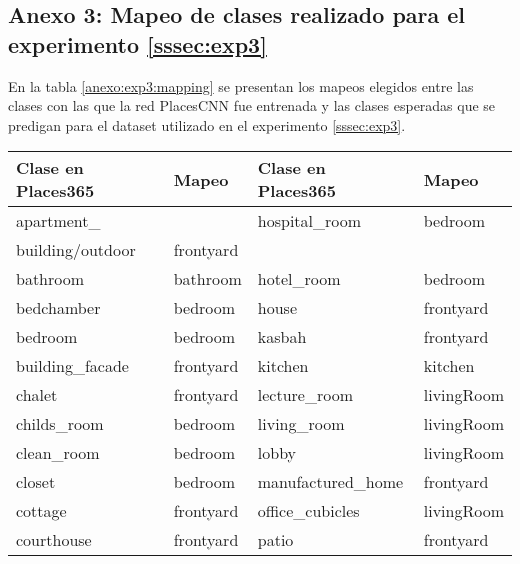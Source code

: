 \subsection{Anexo 3: Mapeo de clases realizado para el experimento \ref{sssec:exp3}}\label{ssec:anexo3}
En la tabla \ref{anexo:exp3:mapping} se presentan los mapeos elegidos entre las clases con las que la red PlacesCNN fue entrenada y las clases esperadas que se predigan para el dataset utilizado en el experimento \ref{sssec:exp3}.
\begin{table}[h!]
	\noindent
	\begin{tabular}{||l|l||l|l||}
		\toprule                                                                                        		Clase en Places365 &       Mapeo & 		Clase en Places365 &       Mapeo \\                                                                                                       
		\midrule
		\midrule 
		apartment\_ &    {} &       hospital\_room &     bedroom \\
		building/outdoor &    frontyard &       {} &     {} \\
		\midrule                                                                                 
		bathroom &     bathroom &          hotel\_room &     bedroom \\
		\midrule
		bedchamber &      bedroom &               house &   frontyard \\
		\midrule                                                                                   
		bedroom &      bedroom &              kasbah &   frontyard \\      
		\midrule                                                                              
		building\_facade &    frontyard &             kitchen &     kitchen \\
		\midrule
		chalet &    frontyard &        lecture\_room &  livingRoom \\
		\midrule
		childs\_room &      bedroom &         living\_room &  livingRoom \\
		\midrule
		clean\_room &      bedroom &               lobby &  livingRoom \\
		\midrule
		closet &      bedroom &   manufactured\_home &   frontyard \\
		\midrule
		cottage &    frontyard &     office\_cubicles &  livingRoom \\
		\midrule
		courthouse &    frontyard &               patio &   frontyard \\
		\midrule

\end{tabular}
\end{table}
